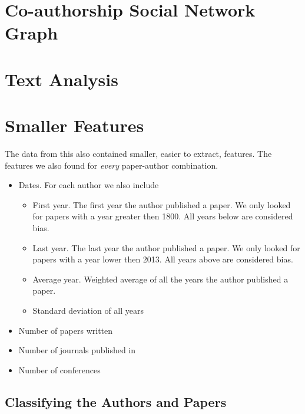 
\section{Co-authorship Social Network Graph \label{sec:graph-implementation}}



\section{Text Analysis \label{sec:text-implementation}}



\section{Smaller Features \label{sec:smaller-features-implementation}}

The data from this also contained smaller, easier to extract, features. The features we also found for \textit{every} paper-author combination.

\begin{itemize}
\item[]Dates. For each author we also include
\begin{itemize}
\item[] First year. The first year the author published a paper. We only looked for papers with a year greater then 1800. All years below are considered bias.
\item[] Last year. The last year the author published a paper. We only looked for papers with a year lower then 2013. All years above are considered bias.
\item[] Average year. Weighted average of all the years the author published a paper.
\item[] Standard deviation of all years
\end{itemize}
\item[] Number of papers written
\item[] Number of journals published in 
\item[] Number of conferences
\end{itemize}


\subsection{Classifying the Authors and Papers \label{sec:classifier-implementation}}

